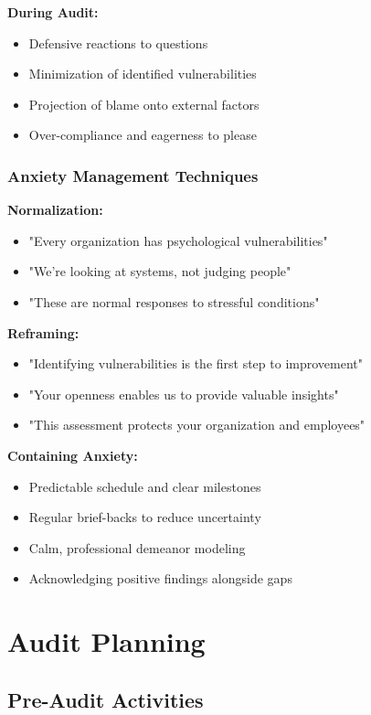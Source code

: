 \documentclass[11pt,a4paper]{article}
\begin{document}
\textbf{During Audit:}
\begin{itemize}
\item Defensive reactions to questions
\item Minimization of identified vulnerabilities
\item Projection of blame onto external factors
\item Over-compliance and eagerness to please
\end{itemize}

\subsubsection{Anxiety Management Techniques}

\textbf{Normalization:}
\begin{itemize}
\item "Every organization has psychological vulnerabilities"
\item "We're looking at systems, not judging people"
\item "These are normal responses to stressful conditions"
\end{itemize}

\textbf{Reframing:}
\begin{itemize}
\item "Identifying vulnerabilities is the first step to improvement"
\item "Your openness enables us to provide valuable insights"
\item "This assessment protects your organization and employees"
\end{itemize}

\textbf{Containing Anxiety:}
\begin{itemize}
\item Predictable schedule and clear milestones
\item Regular brief-backs to reduce uncertainty
\item Calm, professional demeanor modeling
\item Acknowledging positive findings alongside gaps
\end{itemize}

\section{Audit Planning}

\subsection{Pre-Audit Activities}
\end{document}

